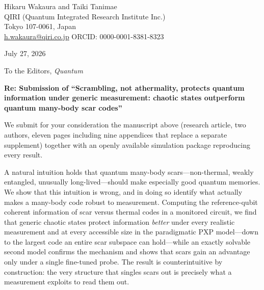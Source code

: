 \documentclass[11pt]{article}
\begin{document}
\pagestyle{empty}

\noindent Hikaru Wakaura and Taiki Tanimae\\
QIRI (Quantum Integrated Research Institute Inc.)\\
Tokyo 107-0061, Japan\\
\href{mailto:h.wakaura@qiri.co.jp}{h.wakaura@qiri.co.jp} \quad ORCID: 0000-0001-8381-8323

\vspace{1em}
\noindent July 27, 2026

\vspace{1em}
\noindent To the Editors, \emph{Quantum}

\vspace{1em}

\noindent \textbf{Re: Submission of ``Scrambling, not athermality, protects
quantum information under generic measurement: chaotic states outperform
quantum many-body scar codes''}

\vspace{0.5em}

We submit for your consideration the manuscript above (research article, two
authors, eleven pages including nine appendices that replace a separate
supplement) together with an openly available simulation package reproducing
every result.

\vspace{0.5em}

A natural intuition holds that quantum many-body scars---non-thermal,
weakly entangled, unusually long-lived---should make especially good quantum
memories. We show that this intuition is wrong, and in doing so identify what
actually makes a many-body code robust to measurement. Computing the
reference-qubit coherent information of scar versus thermal codes in a monitored
circuit, we find that generic chaotic states protect information \emph{better}
under every realistic measurement and at every accessible size in the
paradigmatic PXP model---down to the largest code an entire scar subspace can
hold---while an exactly solvable second model confirms the mechanism and shows
that scars gain an advantage only under a single fine-tuned probe. The result
is counterintuitive by construction: the very structure that singles scars out
is precisely what a measurement exploits to read them out.
\end{document}
